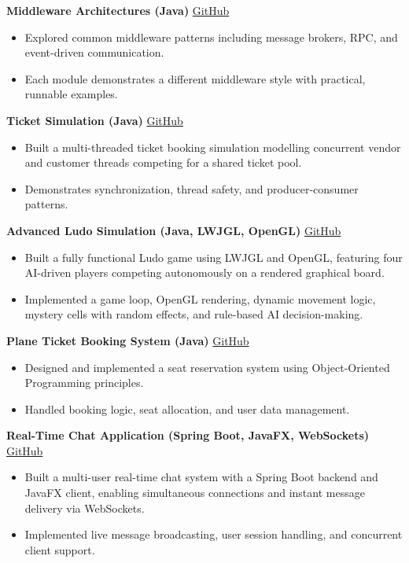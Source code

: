 \documentclass[a4paper,10pt]{article}
\begin{document}
\textbf{Middleware Architectures (Java)} \hfill \href{https://github.com/Senaath-Suraweera/Middleware-Project-Based-Leaning}{GitHub}
\begin{itemize}
    \item Explored common middleware patterns including message brokers, RPC, and event-driven communication.
    \item Each module demonstrates a different middleware style with practical, runnable examples.
\end{itemize}

\textbf{Ticket Simulation (Java)} \hfill \href{https://github.com/Senaath-Suraweera/Ticket-Simulation}{GitHub}
\begin{itemize}
    \item Built a multi-threaded ticket booking simulation modelling concurrent vendor and customer threads competing for a shared ticket pool.
    \item Demonstrates synchronization, thread safety, and producer-consumer patterns.
\end{itemize}

\textbf{Advanced Ludo Simulation (Java, LWJGL, OpenGL)} \hfill \href{https://github.com/Senaath-Suraweera/Ludo-LWJGL}{GitHub}
\begin{itemize}
    \item Built a fully functional Ludo game using LWJGL and OpenGL, featuring four AI-driven players competing autonomously on a rendered graphical board.
    \item Implemented a game loop, OpenGL rendering, dynamic movement logic, mystery cells with random effects, and rule-based AI decision-making.
\end{itemize}

\textbf{Plane Ticket Booking System (Java)} \hfill \href{https://github.com/Senaath-Suraweera/Plane-Ticket-Management-System}{GitHub}
\begin{itemize}
    \item Designed and implemented a seat reservation system using Object-Oriented Programming principles.
    \item Handled booking logic, seat allocation, and user data management.
\end{itemize}

\textbf{Real-Time Chat Application (Spring Boot, JavaFX, WebSockets)} \hfill \href{https://github.com/Senaath-Suraweera/ChatApp-Backend}{GitHub}
\begin{itemize}
    \item Built a multi-user real-time chat system with a Spring Boot backend and JavaFX client, enabling simultaneous connections and instant message delivery via WebSockets.
    \item Implemented live message broadcasting, user session handling, and concurrent client support.
\end{itemize}
\end{document}
